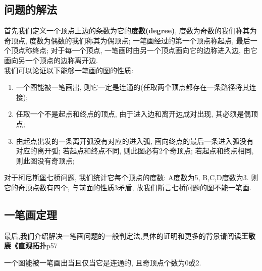 \documentclass[main]{subfiles}
\begin{document}
\subsection*{问题的解法}
首先我们定义一个顶点上边的条数为它的\textbf{度数(degree)}, 度数为奇数的我们称其为奇顶点, 度数为偶数的我们称其为偶顶点; 一笔画经过的第一个顶点称起点, 最后一个顶点称终点; 
对于每一个顶点, 一笔画时由另一个顶点画向它的边称进入边, 由它画向另一个顶点的边称离开边. \\
我们可以论证以下能够一笔画的图的性质: 
\begin{enumerate}
  \item 一个图能被一笔画出, 则它一定是连通的(任取两个顶点都存在一条路径将其连接);
  \item 任取一个不是起点和终点的顶点, 由于进入边和离开边成对出现, 其必须是偶顶点;
  \item 由起点出发的一条离开弧没有对应的进入弧, 画向终点的最后一条进入弧没有对应的离开弧; 若起点和终点不同, 则此图必有2个奇顶点; 若起点和终点相同, 则此图没有奇顶点;
\end{enumerate}
对于柯尼斯堡七桥问题, 我们统计它每个顶点的度数: A度数为5, B,C,D度数为3.
则它的奇顶点数有四个, 与前面的性质3矛盾, 故我们断言七桥问题的图不能一笔画. 
\subsection*{一笔画定理}
最后,我们介绍解决一笔画问题的一般判定法,具体的证明和更多的背景请阅读\textbf{王敬赓《直观拓扑}p57
\begin{theorem}[一笔画定理]
  一个图能被一笔画出当且仅当它是连通的, 且奇顶点个数为0或2.
\end{theorem}
\end{document}
